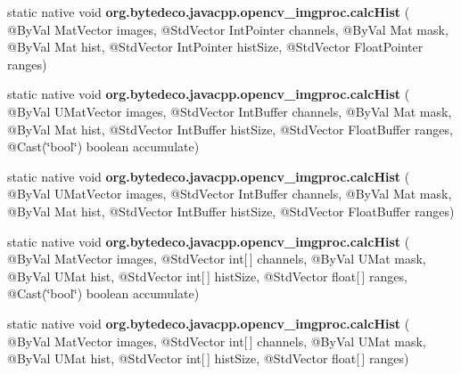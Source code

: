 \begin{DoxyCompactItemize}
\item 
\mbox{\label{group__imgproc__hist_ga2cc7bdd96b3fc36b32d6143df5ea392e}} 
static native void {\bfseries org.\+bytedeco.\+javacpp.\+opencv\+\_\+imgproc.\+calc\+Hist} ( @By\+Val Mat\+Vector images, @Std\+Vector Int\+Pointer channels, @By\+Val Mat mask, @By\+Val Mat hist, @Std\+Vector Int\+Pointer hist\+Size, @Std\+Vector Float\+Pointer ranges)
\item 
\mbox{\label{group__imgproc__hist_ga30c308d7acd673227e77e24906d247a2}} 
static native void {\bfseries org.\+bytedeco.\+javacpp.\+opencv\+\_\+imgproc.\+calc\+Hist} ( @By\+Val U\+Mat\+Vector images, @Std\+Vector Int\+Buffer channels, @By\+Val Mat mask, @By\+Val Mat hist, @Std\+Vector Int\+Buffer hist\+Size, @Std\+Vector Float\+Buffer ranges, @Cast(\char`\"{}bool\char`\"{}) boolean accumulate)
\item 
\mbox{\label{group__imgproc__hist_ga58e4192f36103e5179852a23a7987409}} 
static native void {\bfseries org.\+bytedeco.\+javacpp.\+opencv\+\_\+imgproc.\+calc\+Hist} ( @By\+Val U\+Mat\+Vector images, @Std\+Vector Int\+Buffer channels, @By\+Val Mat mask, @By\+Val Mat hist, @Std\+Vector Int\+Buffer hist\+Size, @Std\+Vector Float\+Buffer ranges)
\item 
\mbox{\label{group__imgproc__hist_ga219419019fcf7a802cbad2fa504a6de5}} 
static native void {\bfseries org.\+bytedeco.\+javacpp.\+opencv\+\_\+imgproc.\+calc\+Hist} ( @By\+Val Mat\+Vector images, @Std\+Vector int\mbox{[}$\,$\mbox{]} channels, @By\+Val U\+Mat mask, @By\+Val U\+Mat hist, @Std\+Vector int\mbox{[}$\,$\mbox{]} hist\+Size, @Std\+Vector float\mbox{[}$\,$\mbox{]} ranges, @Cast(\char`\"{}bool\char`\"{}) boolean accumulate)
\item 
\mbox{\label{group__imgproc__hist_ga2bd46723f7d11c8a327e1e51d244014d}} 
static native void {\bfseries org.\+bytedeco.\+javacpp.\+opencv\+\_\+imgproc.\+calc\+Hist} ( @By\+Val Mat\+Vector images, @Std\+Vector int\mbox{[}$\,$\mbox{]} channels, @By\+Val U\+Mat mask, @By\+Val U\+Mat hist, @Std\+Vector int\mbox{[}$\,$\mbox{]} hist\+Size, @Std\+Vector float\mbox{[}$\,$\mbox{]} ranges)
\item 
\mbox{\label{group__imgproc__hist_ga426a6950b99d749c28cc0961ef6b8828}} 

\end{DoxyCompactItemize}
